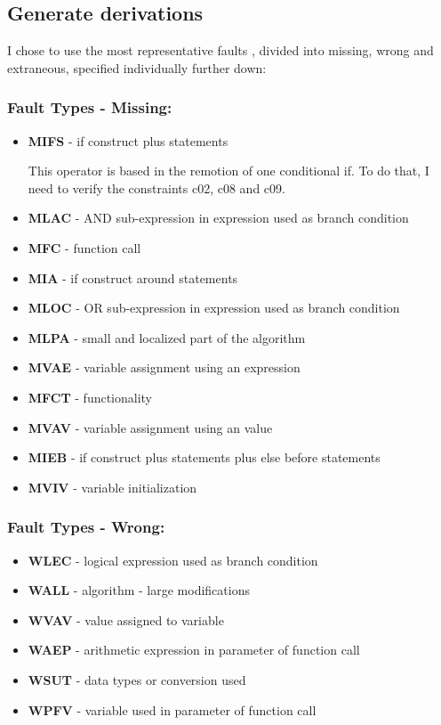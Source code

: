 \subsection{Generate derivations}

I chose to use the most representative faults \cite{duraes2006emulation}, divided into missing, wrong and extraneous, specified individually further down:


\subsubsection{Fault Types - Missing:}
\begin{itemize}
	\item \textbf{MIFS} - if construct plus statements

	This operator is based in the remotion of one conditional if. To do that, I need to verify the constraints c02, c08 and c09.
	\item \textbf{MLAC} - AND sub-expression in expression used as branch condition
	\item \textbf{MFC}  - function call
	\item \textbf{MIA}  - if construct around statements
	\item \textbf{MLOC} - OR sub-expression in expression used as branch condition
	\item \textbf{MLPA} - small and localized part of the algorithm
	\item \textbf{MVAE} - variable assignment using an expression
	\item \textbf{MFCT} - functionality
	\item \textbf{MVAV} - variable assignment using an value
	\item \textbf{MIEB} - if construct plus statements plus else before statements
	\item \textbf{MVIV} - variable initialization
\end{itemize}

\subsubsection{Fault Types - Wrong:}
\begin{itemize}
	\item \textbf{WLEC} - logical expression used as branch condition
	\item \textbf{WALL} - algorithm - large modifications
	\item \textbf{WVAV} - value assigned to variable
	\item \textbf{WAEP} - arithmetic expression in parameter of function call
	\item \textbf{WSUT} - data types or conversion used
	\item \textbf{WPFV} - variable used in parameter of function call
\end{itemize}

